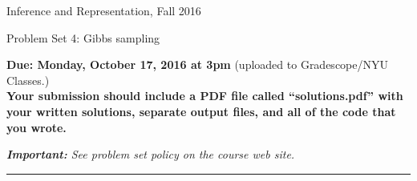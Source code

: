 \documentclass{article}
\newcommand{\ruleskip}{\bigskip\hrule\bigskip}
\begin{document}
\pagestyle{myheadings} 

{\LARGE 
\begin{center}Inference and Representation, Fall 2016\end{center}
}

{\Large
Problem Set 4: Gibbs sampling
}

{\bf Due: Monday, October 17, 2016 at 3pm} (uploaded to Gradescope/NYU Classes.)\\

{\bf Your submission should include a PDF file called ``solutions.pdf''
  with your written solutions, separate output files, and all of the
  code that you wrote.}

{\em {\bf Important:} See problem set policy on the course web site.}
\ruleskip


\newcommand{\eparam}{\ensuremath{\eta}}
\newcommand{\meanpar}{\ensuremath{\mu}}
\newcommand{\Exs}{\ensuremath{\mathbb{E}}}
\newcommand{\bksl}{\ensuremath{\backslash}}
\newcommand{\mprob}{\ensuremath{\mathbb{P}}}
\newcommand{\indmark}{\ensuremath{\perp}}
\newcommand{\graph}{\ensuremath{G}}
\newcommand{\vertex}{\ensuremath{V}}
\newcommand{\estim}[1]{\ensuremath{\widehat{#1}}}
\newcommand{\myxsam}[1]{\ensuremath{x_{#1}}}
\newcommand{\myysam}[1]{\ensuremath{y_{#1}}}
\newcommand{\ypred}[1]{\ensuremath{\widetilde{y}^{(#1)}}}

\def\b{\backslash}

\def\child{\xi}


\end{document}
